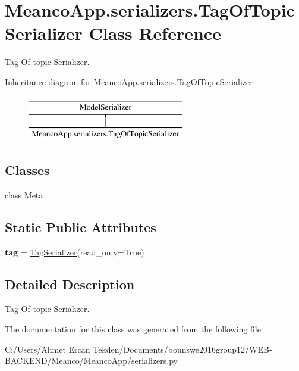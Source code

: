 \hypertarget{class_meanco_app_1_1serializers_1_1_tag_of_topic_serializer}{}\section{Meanco\+App.\+serializers.\+Tag\+Of\+Topic\+Serializer Class Reference}
\label{class_meanco_app_1_1serializers_1_1_tag_of_topic_serializer}


Tag Of topic Serializer.  


Inheritance diagram for Meanco\+App.\+serializers.\+Tag\+Of\+Topic\+Serializer\+:\begin{figure}[H]
\begin{center}
\leavevmode
\includegraphics[height=2.000000cm]{class_meanco_app_1_1serializers_1_1_tag_of_topic_serializer}
\end{center}
\end{figure}
\subsection*{Classes}
\begin{DoxyCompactItemize}
\item 
class \hyperlink{class_meanco_app_1_1serializers_1_1_tag_of_topic_serializer_1_1_meta}{Meta}
\end{DoxyCompactItemize}
\subsection*{Static Public Attributes}
\begin{DoxyCompactItemize}
\item 
\hypertarget{class_meanco_app_1_1serializers_1_1_tag_of_topic_serializer_a8a9173bcbd93467c60d89ebc132fa6af}{}\label{class_meanco_app_1_1serializers_1_1_tag_of_topic_serializer_a8a9173bcbd93467c60d89ebc132fa6af} 
{\bfseries tag} = \hyperlink{class_meanco_app_1_1serializers_1_1_tag_serializer}{Tag\+Serializer}(read\+\_\+only=True)
\end{DoxyCompactItemize}


\subsection{Detailed Description}
Tag Of topic Serializer. 

The documentation for this class was generated from the following file\+:\begin{DoxyCompactItemize}
\item 
C\+:/\+Users/\+Ahmet Ercan Tekden/\+Documents/bounswe2016group12/\+W\+E\+B-\/\+B\+A\+C\+K\+E\+N\+D/\+Meanco/\+Meanco\+App/serializers.\+py\end{DoxyCompactItemize}
